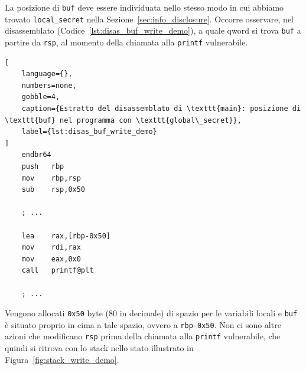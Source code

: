 La posizione di \texttt{buf} deve essere individuata nello stesso modo in cui abbiamo trovato \texttt{local\_secret} nella Sezione~\ref{sec:info_disclosure}. Occorre osservare, nel disassemblato (Codice~\ref{lst:disas_buf_write_demo}), a quale qword si trova \texttt{buf} a partire da \texttt{rsp}, al momento della chiamata alla \texttt{printf} vulnerabile.
\begin{lstlisting}[
    language={},
    numbers=none,
    gobble=4,
    caption={Estratto del disassemblato di \texttt{main}: posizione di \texttt{buf} nel programma con \texttt{global\_secret}},
    label={lst:disas_buf_write_demo}
]
    endbr64
    push   rbp
    mov    rbp,rsp
    sub    rsp,0x50
    
    ; ...

    lea    rax,[rbp-0x50]
    mov    rdi,rax
    mov    eax,0x0
    call   printf@plt

    ; ...
\end{lstlisting}
Vengono allocati \texttt{0x50} byte (80 in decimale) di spazio per le variabili locali e \texttt{buf} è situato proprio in cima a tale spazio, ovvero a \texttt{rbp-0x50}. Non ci sono altre azioni che modificano \texttt{rsp} prima della chiamata alla \texttt{printf} vulnerabile, che quindi si ritrova con lo stack nello stato illustrato in Figura~\ref{fig:stack_write_demo}.

